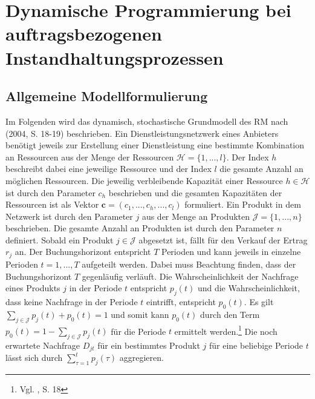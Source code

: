 \chapter{Dynamische Programmierung bei auftragsbezogenen Instandhaltungsprozessen}
\setcounter{footnote}{7}

\section{Allgemeine Modellformulierung}
Im Folgenden wird das dynamisch, stochastische Grundmodell des RM nach \citeauthor{talluri2004revenue} (2004, S. 18-19) beschrieben. Ein Dienstleistungsnetzwerk eines Anbieters benötigt jeweils zur Erstellung einer Dienstleistung eine bestimmte Kombination an Ressourcen aus der Menge der Ressourcen $\mathcal{H} = \{1,...,l \}$. Der Index $h$ beschreibt dabei eine jeweilige Ressource und der Index $l$ die gesamte Anzahl an möglichen Ressourcen. Die jeweilig verbleibende Kapazität einer Ressource $h \in \mathcal{H}$ ist durch den Parameter $c_{h}$ beschrieben und die gesamten Kapazitäten der Ressourcen ist als Vektor $\textbf{c}=(c_{1},...,c_{h},...,c_{l})$ formuliert. Ein Produkt in dem Netzwerk ist durch den Parameter $j$ aus der Menge an Produkten $\mathcal{J} = \{1,...,n \}$ %
beschrieben. Die gesamte Anzahl an Produkten ist durch den Parameter $n$ definiert. Sobald ein Produkt $j\in \mathcal{J}$ abgesetzt ist, fällt für den Verkauf der Ertrag $r_{j}$ an. Der Buchungshorizont entspricht $T$ Perioden und kann jeweils in einzelne Perioden $t=1,...,T$ aufgeteilt werden. Dabei muss Beachtung finden, dass der Buchungshorizont $T$ gegenläufig verläuft. Die Wahrscheinlichkeit der Nachfrage eines Produkts $j$ in der Periode $t$ entspricht $p_{j}(t)$ und die Wahrscheinlichkeit, dass keine Nachfrage in der Periode $t$ eintrifft, entspricht $p_{0}(t)$. Es gilt $\sum_{j\in \mathcal{J}}p_{j}(t)+p_{0}(t)=1$ und somit kann $p_{0}(t)$ durch den Term $p_{0}(t)=1-\sum_{j\in \mathcal{J}}p_{j}(t)$ für die Periode $t$ ermittelt werden.\footnote{Vgl. \citeauthor{talluri2004revenue}, S. 18} Die noch erwartete Nachfrage $D_{jt}$ für ein bestimmtes Produkt $j$ für eine beliebige Periode $t$ lässt sich durch $\sum_{\tau=1}^{t}p_{j}(\tau)$ aggregieren.\\

